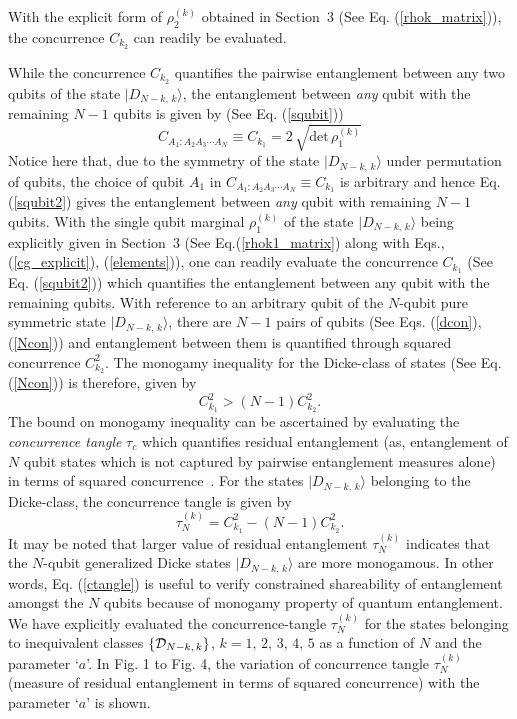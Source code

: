 \documentclass[pra,a4paper,showpacs,superscriptaddress]{revtex4}
\newcommand{\be}{\begin{equation}}
\newcommand{\ee}{\end{equation}}
\begin{document}
With the explicit form of $\rho^{(k)}_2$ obtained in Section~3 (See Eq. (\ref{rhok_matrix})), the concurrence $C_{k_{2}}$ can readily be evaluated. 

While the concurrence $C_{k_{2}}$ quantifies the pairwise entanglement between any two qubits of the state $\vert D_{N-k,\, k}\rangle$, the entanglement  between {\emph {any}} qubit with the remaining $N-1$ qubits is given by (See Eq. (\ref{squbit}))
\be
\label{squbit2}
C_{A_1:A_2A_3\cdots A_N}\equiv C_{k_{1}}=2 \,\sqrt{\mbox{det}\,\rho^{(k)}_1}
\ee 
Notice here that, due to the symmetry of the state  $\vert D_{N-k,\, k}\rangle$ under permutation of qubits, the choice of qubit $A_1$ in 
$C_{A_1:A_2A_3\cdots A_N}\equiv C_{k_{1}}$ is arbitrary and hence Eq. (\ref{squbit2}) gives the entanglement between {\emph {any}} qubit with remaining $N-1$ qubits. With the single qubit marginal $\rho^{(k)}_1$ of the state $\vert D_{N-k,\, k}\rangle$  
being explicitly given in Section~3 (See Eq.(\ref{rhok1_matrix}) along with Eqs.,(\ref{cg_explicit}), (\ref{elements})), one can readily evaluate the concurrence $C_{k_{1}}$ (See Eq. (\ref{squbit2})) which quantifies the entanglement between any qubit with the remaining qubits. 
With reference to an arbitrary qubit of the $N$-qubit pure symmetric state $\vert D_{N-k,\, k}\rangle$, there are $N-1$ pairs of qubits (See Eqs. (\ref{dcon}), (\ref{Ncon})) and entanglement between them is quantified through squared concurrence $C^2_{k_{2}}$. The monogamy inequality for the Dicke-class of states (See Eq. (\ref{Ncon})) is therefore, given by
\be 
C^2_{k_{1}}>(N-1)C^2_{k_{2}}. 
\ee 
The bound on monogamy inequality can be ascertained by evaluating the {\emph{concurrence tangle}}
$\tau_c$ which quantifies residual entanglement (as, entanglement of $N$ qubit states which is not captured by  pairwise entanglement measures alone) 
in terms of squared concurrence~\cite{ckw}. For the states $\vert D_{N-k,\, k}\rangle$ belonging to the Dicke-class, the concurrence tangle is given by 
\be
\label{ctangle}
\tau^{(k)}_N=C^2_{k_{1}}-(N-1)C^2_{k_{2}}. 
\ee
It may be noted that larger value of  residual entanglement $\tau^{(k)}_N$ indicates that the $N$-qubit generalized Dicke states 
$\vert D_{N-k,\,k}\rangle$ are more monogamous. In other words, Eq. (\ref{ctangle}) is useful to verify constrained shareability of entanglement amongst the $N$ qubits because of monogamy property  of quantum entanglement.
We have explicitly evaluated the concurrence-tangle $\tau^{(k)}_N$ for the states belonging to inequivalent classes  
$\{{\cal {D}}_{N-k,\,k}\}$,  $k=1,\,2,\,3,\,4,\,5$ as a function of $N$ and the parameter `$a$'.  
In Fig. 1 to Fig. 4, the variation of concurrence tangle  $\tau_N^{(k)}$ (measure of residual entanglement in terms of squared concurrence) with the parameter `$a$'  is shown. 
\end{document}
